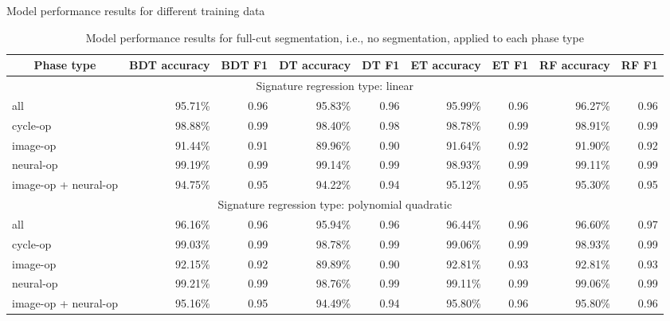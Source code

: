 \begin{table*}[htbp]
    \centering
    \caption{Model performance results for different training data}
    \label{tab:model_performance}
    \begin{subtable}{\textwidth}
        \centering
        \caption{Model performance results for full-cut segmentation, i.e., no segmentation, applied to each phase type}
        \label{tab:model_performance_full}
	    \begin{tabular}{@{}lrrrrrrrr@{}}
	        \toprule
	        \multicolumn{1}{c}{\textbf{Phase type}} & 
	        \multicolumn{1}{c}{\textbf{BDT accuracy}} & 
	        \multicolumn{1}{c}{\textbf{BDT F1}} & 
	        \multicolumn{1}{c}{\textbf{DT accuracy}} &
	        \multicolumn{1}{c}{\textbf{DT F1}} &
	        \multicolumn{1}{c}{\textbf{ET accuracy}} &
	        \multicolumn{1}{c}{\textbf{ET F1}} &
	        \multicolumn{1}{c}{\textbf{RF accuracy}} &
	        \multicolumn{1}{c}{\textbf{RF F1}} \\
	        \midrule
	        \multicolumn{9}{c}{Signature regression type: linear} \\
	        \midrule
	        all						& 95.71\%  & 0.96  & 95.83\%  & 0.96  & 95.99\%  & 0.96  & 96.27\%  & 0.96 \\
	        cycle-op 				& 98.88\%  & 0.99  & 98.40\%  & 0.98  & 98.78\%  & 0.99  & 98.91\%  & 0.99 \\
	        image-op 				& 91.44\%  & 0.91  & 89.96\%  & 0.90  & 91.64\%  & 0.92  & 91.90\%  & 0.92 \\
	        neural-op 				& 99.19\%  & 0.99  & 99.14\%  & 0.99  & 98.93\%  & 0.99  & 99.11\%  & 0.99 \\
	        image-op + neural-op 	& 94.75\%  & 0.95  & 94.22\%  & 0.94  & 95.12\%  & 0.95  & 95.30\%  & 0.95 \\
	        \midrule
	        \multicolumn{9}{c}{Signature regression type: polynomial quadratic} \\
	        \midrule
	        all 					& 96.16\%  & 0.96  & 95.94\%  & 0.96  & 96.44\%  & 0.96  & 96.60\%  & 0.97 \\
	        cycle-op 				& 99.03\%  & 0.99  & 98.78\%  & 0.99  & 99.06\%  & 0.99  & 98.93\%  & 0.99 \\
	        image-op 				& 92.15\%  & 0.92  & 89.89\%  & 0.90  & 92.81\%  & 0.93  & 92.81\%  & 0.93 \\
	        neural-op 				& 99.21\%  & 0.99  & 98.76\%  & 0.99  & 99.11\%  & 0.99  & 99.06\%  & 0.99 \\
	        image-op + neural-op 	& 95.16\%  & 0.95  & 94.49\%  & 0.94  & 95.80\%  & 0.96  & 95.80\%  & 0.96 \\

\end{tabular}
\end{subtable}
\end{table*}
